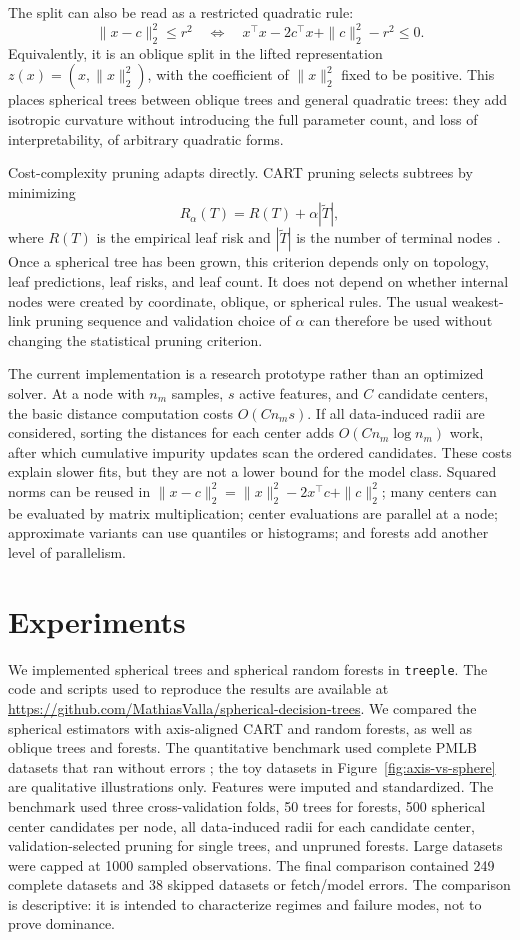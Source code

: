\documentclass[final,5p,times,twocolumn]{elsarticle}
\begin{document}
The split can also be read as a restricted quadratic rule:
\[
    \|x-c\|_2^2\le r^2
    \quad\Longleftrightarrow\quad
    x^\top x - 2c^\top x + \|c\|_2^2-r^2 \le 0.
\]
Equivalently, it is an oblique split in the lifted representation
$z(x)=(x,\|x\|_2^2)$, with the coefficient of $\|x\|_2^2$ fixed to be positive.
This places spherical trees between oblique trees and general quadratic trees:
they add isotropic curvature without introducing the full parameter count, and
loss of interpretability, of arbitrary quadratic forms.

Cost-complexity pruning adapts directly. CART pruning selects subtrees by
minimizing
\[
    R_\alpha(T) = R(T) + \alpha |\widetilde{T}|,
\]
where $R(T)$ is the empirical leaf risk and $|\widetilde{T}|$ is the number of
terminal nodes \cite{breiman1984cart}. Once a spherical tree has been grown,
this criterion depends only on topology, leaf predictions, leaf risks, and leaf
count. It does not depend on whether internal nodes were created by coordinate,
oblique, or spherical rules. The usual weakest-link pruning sequence and
validation choice of $\alpha$ can therefore be used without changing the
statistical pruning criterion.

The current implementation is a research prototype rather than an optimized
solver. At a node with $n_m$ samples, $s$ active features, and $C$ candidate
centers, the basic distance computation costs $O(C n_m s)$. If all
data-induced radii are considered, sorting the distances for each center adds
$O(C n_m\log n_m)$ work, after which cumulative impurity updates scan the
ordered candidates. These costs explain slower fits, but they are not a lower
bound for the model class. Squared norms can be reused in
$\|x-c\|_2^2=\|x\|_2^2-2x^\top c+\|c\|_2^2$; many centers can be evaluated by
matrix multiplication; center evaluations are parallel at a node; approximate
variants can use quantiles or histograms; and forests add another level of
parallelism.

\section{Experiments}

We implemented spherical trees and spherical random forests in
\texttt{treeple}. The code and scripts used to reproduce the results are
available at \url{https://github.com/MathiasValla/spherical-decision-trees}.
We compared the spherical estimators with axis-aligned CART and random forests,
as well as oblique trees and forests. The quantitative benchmark used complete
PMLB datasets that ran without errors \cite{olson2017pmlb}; the toy datasets
in Figure~\ref{fig:axis-vs-sphere} are qualitative illustrations only. Features
were imputed and standardized. The benchmark used three cross-validation folds,
50 trees for forests, 500 spherical center candidates per node, all
data-induced radii for each candidate center, validation-selected pruning for
single trees, and unpruned forests. Large datasets were capped at 1000 sampled
observations. The final comparison contained 249 complete datasets and 38
skipped datasets or fetch/model errors. The comparison is descriptive: it is
intended to characterize regimes and failure modes, not to prove dominance.
\end{document}
